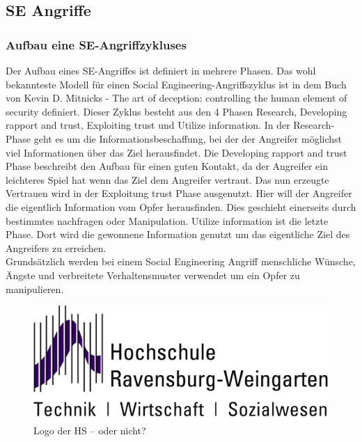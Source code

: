 	\subsection{SE Angriffe}
		\subsubsection{Aufbau eine SE-Angriffzykluses}
		Der Aufbau eines SE-Angriffes ist definiert in mehrere Phasen. Das wohl bekannteste Modell für einen Social Engineering-Angriffszyklus ist in dem Buch von Kevin D. Mitnicks - The art of deception: controlling the human element of security \cite{ArtOfDeception} definiert. Dieser Zyklus besteht aus den 4 Phasen Research, Developing rapport and trust, Exploiting trust und Utilize information.
		In der Research-Phase geht es um die Informationsbeschaffung, bei der der Angreifer möglichst viel Informationen über das Ziel herausfindet. Die Developing rapport and trust Phase beschreibt den Aufbau für einen guten Kontakt, da der Angreifer ein leichteres Spiel hat wenn das Ziel dem Angreifer vertraut. Das nun erzeugte Vertrauen wird in der Exploitung trust Phase ausgenutzt. Hier will der Angreifer die eigentlich Information vom Opfer herausfinden. Dies geschieht einerseits durch bestimmtes nachfragen oder Manipulation. Utilize information ist die letzte Phase. Dort wird die gewonnene Information genutzt um das eigentliche Ziel des Angreifers zu erreichen.\\
		Grundsätzlich werden bei einem Social Engineering Angriff menschliche Wünsche, Ängste und verbreitete Verhaltensmuster verwendet um ein Opfer zu manipulieren.\cite{LeitfadenSE}\\
		\FloatBarrier
		\begin{figure}
			\begin{center}
				\includegraphics*{bilder/HSLogoWGd}
				\caption{Logo der HS -- oder nicht?}
				\label{fig:logo}
			\end{center}
		\end{figure}
		
